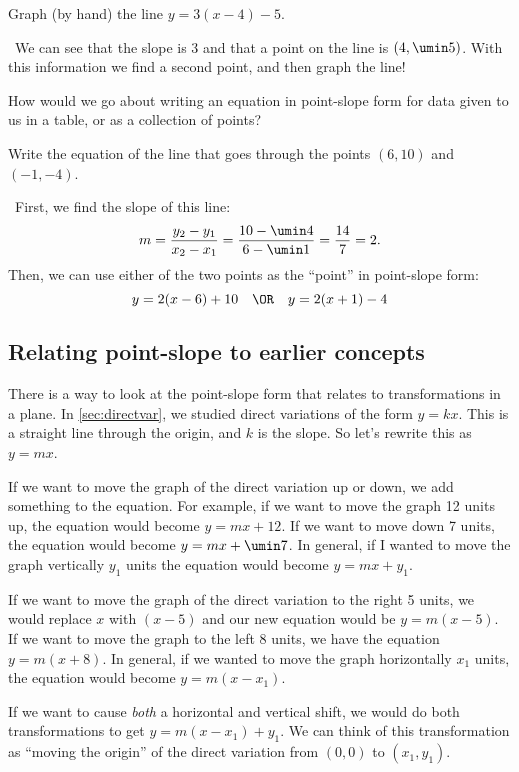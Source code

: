\begin{boxex}
Graph (by hand) the line $y=3(x-4)-5$.

\expsoln\ We can see that the slope is 3 and that a point on the line is $(4,\umin5)$. With this information we find a second point, and then graph the line!
\end{boxex}

How would we go about writing an equation in point-slope form for data given to us in a table, or as a collection of points?

\begin{boxex}
Write the equation of the line that goes through the points $(6, 10)$ and $(-1, -4)$.

\exsoln\ First, we find the slope of this line: \[m = \frac{y_2-y_1}{x_2-x_1} = \frac{10-\umin4}{6-\umin1} = \frac{14}{7} = 2.\] Then, we can use either of the two points as the ``point'' in point-slope form: \[y=2(x-6)+10 \quad\OR\quad y=2(x+1)-4\]
\end{boxex}

\subsection{Relating point-slope to earlier concepts}

There is a way to look at the point-slope form that relates to transformations in a plane. In \cref{sec:directvar}, we studied direct variations of the form $y = kx$. This is a straight line through the origin, and $k$ is the slope. So let's rewrite this as $y=mx$.

If we want to move the graph of the direct variation up or down, we add something to the equation. For example, if we want to move the graph 12 units up, the equation would become $y = mx + 12$. If we want to move down 7 units, the equation would become $y = mx + \umin7$. In general, if I wanted to move the graph vertically $y_1$ units the equation would become $y = mx + y_1$.

If we want to move the graph of the direct variation to the right 5 units, we would replace $x$ with $(x-5)$ and our new equation would be $y = m(x-5)$. If we want to move the graph to the left 8 units, we have the equation $y = m(x + 8)$. In general, if we wanted to move the graph horizontally $x_1$ units, the equation would become $y = m(x-x_1)$.

If we want to cause \textit{both} a horizontal and vertical shift, we would do both transformations to get $y=m(x-x_1)+y_1$. We can think of this transformation as ``moving the origin'' of the direct variation from $(0, 0)$ to $(x_1, y_1)$.

